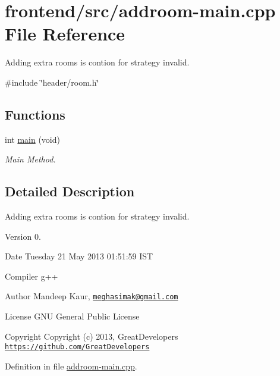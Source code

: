 \hypertarget{addroom-main_8cpp}{\section{frontend/src/addroom-\/main.cpp \-File \-Reference}
\label{d7/d0f/addroom-main_8cpp}
}


\-Adding extra rooms is contion for strategy invalid.  


{\ttfamily \#include \char`\"{}header/room.\-h\char`\"{}}\*
\subsection*{\-Functions}
\begin{DoxyCompactItemize}
\item 
int \hyperlink{addroom-main_8cpp_a568b3afc214ba30be5bf526d6b27b611}{main} (void)
\begin{DoxyCompactList}\small\item\em \-Main \-Method. \end{DoxyCompactList}\end{DoxyCompactItemize}


\subsection{\-Detailed \-Description}
\-Adding extra rooms is contion for strategy invalid. \begin{DoxyVersion}{\-Version}
0. 
\end{DoxyVersion}
\begin{DoxyDate}{\-Date}
\-Tuesday 21 \-May 2013 01\-:51\-:59 \-I\-S\-T\par
 \-Compiler g++
\end{DoxyDate}
\begin{DoxyAuthor}{\-Author}
\-Mandeep \-Kaur, \href{mailto:meghasimak@gmail.com}{\tt meghasimak@gmail.\-com}\par
 \-License \-G\-N\-U \-General \-Public \-License 
\end{DoxyAuthor}
\begin{DoxyCopyright}{\-Copyright}
\-Copyright (c) 2013, \-Great\-Developers \href{https://github.com/GreatDevelopers}{\tt https\-://github.\-com/\-Great\-Developers} 
\end{DoxyCopyright}


\-Definition in file \hyperlink{addroom-main_8cpp_source}{addroom-\/main.\-cpp}.



